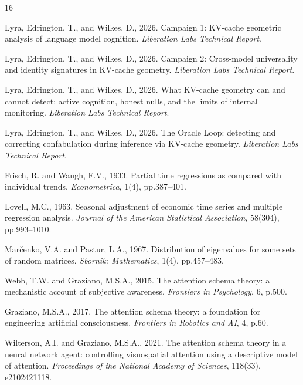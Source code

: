 \documentclass[11pt,a4paper]{article}
\begin{document}
\begin{thebibliography}{16}

Lyra, Edrington, T., and Wilkes, D., 2026. Campaign 1: KV-cache geometric
analysis of language model cognition. \textit{Liberation Labs Technical
Report}.

Lyra, Edrington, T., and Wilkes, D., 2026. Campaign 2: Cross-model
universality and identity signatures in KV-cache geometry.
\textit{Liberation Labs Technical Report}.

Lyra, Edrington, T., and Wilkes, D., 2026. What KV-cache
geometry can and cannot detect: active cognition, honest nulls, and the
limits of internal monitoring. \textit{Liberation Labs Technical Report}.

Lyra, Edrington, T., and Wilkes, D., 2026. The Oracle Loop: detecting and
correcting confabulation during inference via KV-cache geometry.
\textit{Liberation Labs Technical Report}.

Frisch, R. and Waugh, F.V., 1933. Partial time regressions as compared
with individual trends. \textit{Econometrica}, 1(4), pp.387--401.

Lovell, M.C., 1963. Seasonal adjustment of economic time series and
multiple regression analysis. \textit{Journal of the American Statistical
Association}, 58(304), pp.993--1010.

Mar\v{c}enko, V.A. and Pastur, L.A., 1967. Distribution of eigenvalues
for some sets of random matrices. \textit{Sbornik: Mathematics}, 1(4),
pp.457--483.

Webb, T.W. and Graziano, M.S.A., 2015. The attention schema theory: a
mechanistic account of subjective awareness. \textit{Frontiers in
Psychology}, 6, p.500.

Graziano, M.S.A., 2017. The attention schema theory: a foundation for
engineering artificial consciousness. \textit{Frontiers in Robotics and
AI}, 4, p.60.

Wilterson, A.I. and Graziano, M.S.A., 2021. The attention schema theory
in a neural network agent: controlling visuospatial attention using a
descriptive model of attention. \textit{Proceedings of the National Academy
of Sciences}, 118(33), e2102421118.


\end{thebibliography}
\end{document}
